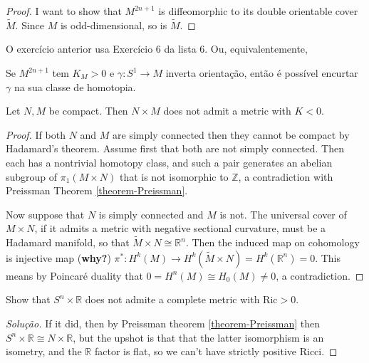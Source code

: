 \begin{proof}
I want to show that $M^{2n+1}$ is diffeomorphic to its double orientable cover
 $\tilde{M}$. Since $M$ is odd-dimensional, so is $\tilde{M}$. 
\end{proof}

O exercício anterior usa Exercício 6 da lista 6. Ou, equivalentemente,

\begin{exercise}
\label{exercise-inverts-orientation-shortened}
Se $M^{2n+1}$ tem $K_M >0$ e $\gamma:S^1 \to M$ inverta orientação, então é
possível encurtar $\gamma$ na sua classe de homotopia.
\end{exercise}

\begin{exercise}
\label{exercise-product-of-compact-does-not-admit-negative-curvature}
Let $N,M$ be compact. Then $N \times M$ does not admit a metric with $K<0$.
\end{exercise}

\begin{proof}
If both $N$ and $M$ are simply connected then they cannot be compact by
Hadamard's theorem. Assume first that both are not simply connected. Then each
has a nontrivial homotopy class, and such a pair generates an abelian subgroup
of $\pi_1(M \times N)$ that is not isomorphic to $\mathbb{Z}$, a contradiction
with Preissman Theorem \ref{theorem-Preissman}.

Now suppose that $N$ is simply connected and $M$ is not. The universal cover of
$M\times N$, if it admits a metric with negative sectional curvature, 
must be a Hadamard manifold, so that $\tilde{M} \times N \cong \mathbb{R}^n$.
Then the induced map on cohomology is injective map ({\bf why?})
$\pi^* :H^{k}(M)\to H^{k}(\tilde{M} \times N)=H^{k}(\mathbb{R}^n)=0$. This means
by Poincaré duality that $0=H^{n}(M)\cong H_0(M)\neq 0$, a contradiction.
\end{proof}

\begin{exercise}
\label{exercise-SnxR-no-positive-Ric}
Show that $S^n \times \mathbb{R}$ does not admite a complete metric with
$\text{Ric}>0$.
\end{exercise}

\begin{proof}[Solução]
If it did, then by Preissman theorem \ref{theorem-Preissman} then $S^n\times
\mathbb{R}\cong N \times \mathbb{R}$, but the upshot is that that the latter 
isomorphism is an isometry, and the $\mathbb{R}$ factor is flat, so we can't 
have strictly positive Ricci.
\end{proof}

